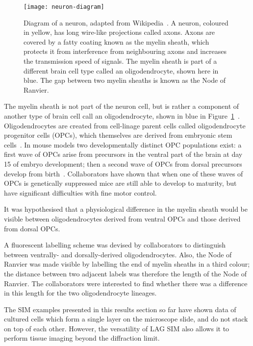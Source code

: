 \begin{figure}[htbp!]
\centering
\texttt{[image: neuron-diagram]}
\caption[LAG SIM: Diagram of a neuron]{Diagram of a neuron,  adapted from Wikipedia~\cite{wikineuron}. A neuron, coloured in yellow, has long wire-like projections called axons. Axons are covered by a fatty coating known as the myelin sheath, which protects it from interference from neighbouring axons and increases the transmission speed of signals. The myelin sheath is part of a different brain cell type called an oligodendrocyte, shown here in blue. The gap between two myelin sheaths is known as the Node of Ranvier. }
\label{fig:neuron-diagram}
\end{figure}

The myelin sheath is not part of the neuron cell, but is rather a component of another type of brain cell call an oligodendrocyte, shown in blue in Figure~\ref{fig:neuron-diagram}~\cite{hammond2012cellular}. 
Oligodendrocytes are created from cell-linage parent cells called oligodendrocyte progenitor cells (OPCs), which themselves are derived from embryonic stem cells~\cite{goldman2015make}. 
In mouse models two developmentally distinct OPC populations exist: a first wave of OPCs arise from precursors in the ventral part of the brain at day 15 of embryo development; then a second wave of OPCs from dorsal precursors develop from birth~\cite{kessaris2006competing}. 
Collaborators have shown that when one of these waves of OPCs is genetically suppressed mice are still able to develop to maturity, but have significant difficulties with fine motor control. 

It was hypothesised that a physiological difference in the myelin sheath would be visible between oligodendrocytes derived from ventral OPCs and those derived from dorsal OPCs. 

A fluorescent labelling scheme was devised by collaborators to distinguish between ventrally- and dorsally-derived oligodendrocytes. 
Also, the Node of Ranvier was made visible by labelling the end of myelin sheaths in a third colour; the distance between two adjacent labels was therefore the length of the Node of Ranvier. 
The collaborators were interested to find whether there was a difference in this length for the two oligodendrocyte lineages. 

The SIM examples presented in this results section so far have shown data of cultured cells which form a single layer on the microscope slide, and do not stack on top of each other. 
However, the versatility of LAG SIM also allows it to perform tissue imaging beyond the diffraction limit. 


